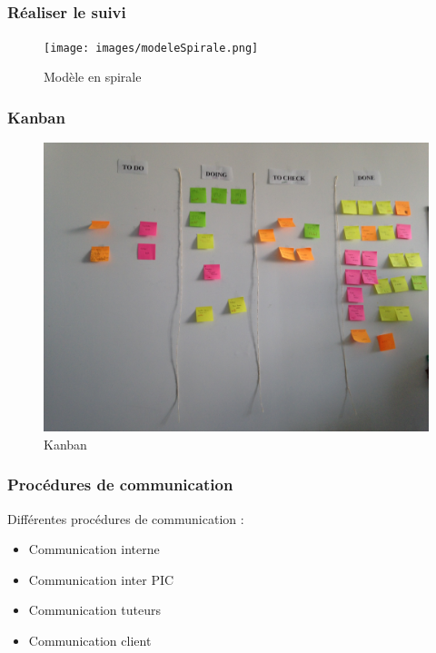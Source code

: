 \subsection{}

\begin{frame}
\frametitle{Réaliser le suivi}
\begin{figure}
\begin{center}
\texttt{[image: images/modeleSpirale.png]}
\caption{Modèle en spirale}
\label{MS}
\end{center}
\end{figure}
\end{frame}

\begin{frame}
\frametitle{Kanban}
\begin{figure}
\includegraphics[scale=0.075]{images/kanban.JPG}
\caption{Kanban}
\label{Kn}
\end{figure}
\end{frame}

\begin{frame}
\frametitle{Procédures de communication}
Différentes procédures de communication :
\begin{itemize}
\item Communication interne
\item Communication inter PIC
\item Communication tuteurs
\item Communication client
\end{itemize}
\end{frame}

